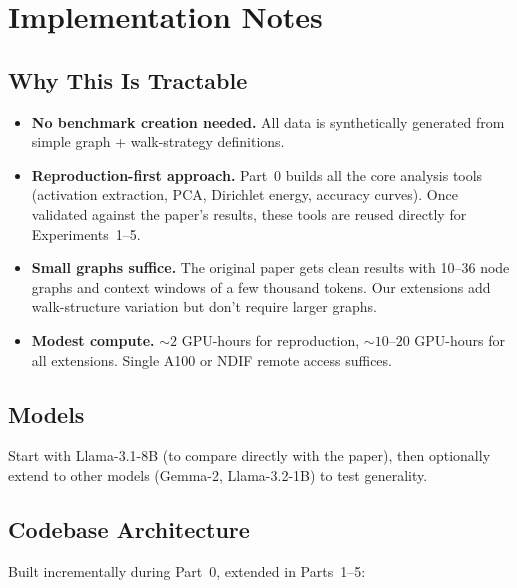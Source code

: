 \documentclass[11pt]{article}
\begin{document}
\section{Implementation Notes}
\label{sec:implementation}

\subsection{Why This Is Tractable}

\begin{itemize}
    \item \textbf{No benchmark creation needed.} All data is synthetically generated from simple graph + walk-strategy definitions.
    \item \textbf{Reproduction-first approach.} Part~0 builds all the core analysis tools (activation extraction, PCA, Dirichlet energy, accuracy curves). Once validated against the paper's results, these tools are reused directly for Experiments~1--5.
    \item \textbf{Small graphs suffice.} The original paper gets clean results with 10--36 node graphs and context windows of a few thousand tokens. Our extensions add walk-structure variation but don't require larger graphs.
    \item \textbf{Modest compute.} ${\sim}2$ GPU-hours for reproduction, ${\sim}10$--$20$ GPU-hours for all extensions. Single A100 or NDIF remote access suffices.
\end{itemize}

\subsection{Models}

Start with Llama-3.1-8B (to compare directly with the paper), then optionally extend to other models (Gemma-2, Llama-3.2-1B) to test generality.

\subsection{Codebase Architecture}

Built incrementally during Part~0, extended in Parts~1--5:
\end{document}
